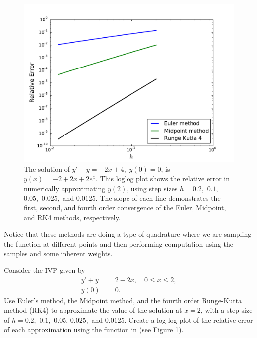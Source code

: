 \begin{figure}[ht]
\centering
\includegraphics[width=\textwidth]{Fig3.pdf}
\caption{The solution of $y' -y= -2x+4,$ $y(0) = 0$, is $y(x) = -2+2x + 2e^x.$ This loglog plot shows the relative error in numerically approximating $y(2)$, using step sizes $h = 0.2,$ $0.1,$ $0.05,$ $0.025,$ and $0.0125$. The slope of each line demonstrates the first, second, and fourth order convergence of the Euler, Midpoint, and RK4 methods, respectively.}
\label{ivp:relative_error}
\end{figure}

Notice that these methods are doing a type of quadrature where we are sampling the function at different points and then performing computation using the samples and some inherent weights.

\begin{problem} Consider the IVP given by
\begin{align*}
y' + y &= 2-2x,\quad 0 \leq x \leq 2, \\
y(0) &= 0.
\end{align*}
Use Euler's method, the Midpoint method, and the fourth order Runge-Kutta method (RK4) to approximate the value of the solution at $x = 2$, with a step size of $h = 0.2,$ $ 0.1,$ $0.05 $, $0.025,$ and $0.0125.$ 
Create a log-log plot of the relative error of each approximation using the  function in  (see Figure \ref{ivp:relative_error}).
\end{problem}

